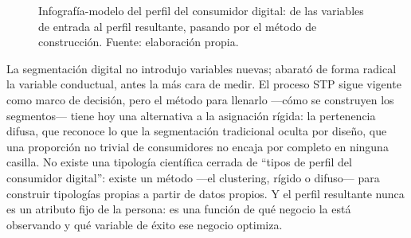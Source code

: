 \begin{figure}[htbp]
  \centering
  
  \caption{Infografía-modelo del perfil del consumidor digital: de las
  variables de entrada al perfil resultante, pasando por el método de
  construcción. Fuente: elaboración propia.}
  \label{fig:parte1-infografia-perfil}
\end{figure}

La segmentación digital no introdujo variables nuevas; abarató de forma
radical la variable conductual, antes la más cara de medir. El proceso STP
sigue vigente como marco de decisión, pero el método para llenarlo —cómo se
construyen los segmentos— tiene hoy una alternativa a la asignación rígida:
la pertenencia difusa, que reconoce lo que la segmentación tradicional
oculta por diseño, que una proporción no trivial de consumidores no encaja
por completo en ninguna casilla. No existe una tipología científica cerrada
de \enquote{tipos de perfil del consumidor digital}: existe un método —el
clustering, rígido o difuso— para construir tipologías propias a partir de
datos propios. Y el perfil resultante nunca es un atributo fijo de la
persona: es una función de qué negocio la está observando y qué variable de
éxito ese negocio optimiza.

